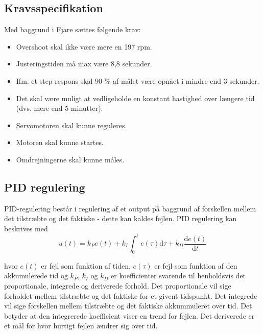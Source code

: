 


\subsection{Kravsspecifikation}
\label{sec:kravsspecifikation}
Med baggrund i Fjare\autocite{pid1} sættes følgende krav:
\begin{itemize}
\item Overshoot skal ikke være mere en 197 rpm.
\item Justeringstiden må max være 8,8 sekunder.
\item Ifm. et step respons skal 90 \% af målet være opnået i mindre end 3 sekunder.
\item Det skal være muligt at vedligeholde en konstant hastighed over længere tid (dvs. mere end 5 minutter).
\item Servomotoren skal kunne reguleres.
\item Motoren skal kunne startes.
\item Omdrejningerne skal kunne måles.
\end{itemize}

\subsection{PID regulering}
\label{sec:overordnet-mal}

PID-regulering består i regulering af et output på baggrund af forskellen mellem det tilstræbte og det faktiske - dette kan kaldes fejlen. PID regulering kan beskrives med
\begin{equation}
  \label{eq:1}
  u(t)=k_Pe(t)+k_I \int_0^t e(\tau)\mathrm{d}\tau + k_D\frac{\mathrm{d}e(t)}{\mathrm{d}t}
\end{equation}

hvor $e(t)$ er fejl som funktion af tiden, $e(\tau)$ er fejl som funktion af den akkumulerede tid og $k_P$, $k_I$ og $k_D$ er koefficienter svarende til henholdsvis det proportionale, integrede og deriverede forhold. Det proportionale vil sige forholdet mellem tilstræbte og det faktiske for et givent tidspunkt. Det integrede vil sige forskellen mellem tilstræbte og det faktiske akkummuleret over tid. Det betyder at den integrerede koefficient viser en trend for fejlen. Det deriverede er et mål for hvor hurtigt fejlen ændrer sig over tid.

